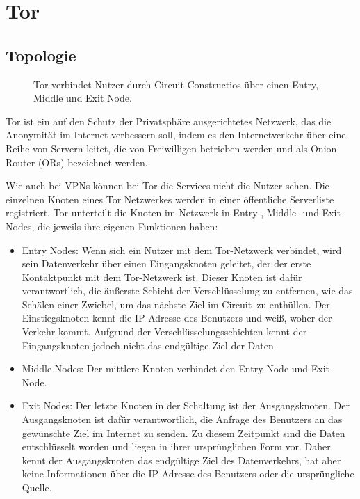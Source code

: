 \section{Tor}
\label{chap:tor}

\subsection{Topologie}
\label{chap:tor_topology}
 
\begin{figure}[h!]
    \centering
    
    \caption{Tor verbindet Nutzer durch Circuit Constructios über einen Entry, Middle und Exit Node.}
    \label{imgs:tor}
\end{figure}

Tor ist ein auf den Schutz der Privatsphäre ausgerichtetes Netzwerk, das die Anonymität im Internet verbessern soll, indem es den Internetverkehr über eine Reihe von Servern leitet, die von Freiwilligen betrieben werden und als Onion Router (ORs) bezeichnet werden.

Wie auch bei VPNs können bei Tor die Services nicht die Nutzer sehen. Die einzelnen Knoten eines Tor Netzwerkes werden in einer öffentliche Serverliste registriert. Tor unterteilt die Knoten im Netzwerk in Entry-, Middle- und Exit-Nodes, die jeweils ihre eigenen Funktionen haben:

\begin{itemize}
    \item Entry Nodes: Wenn sich ein Nutzer mit dem Tor-Netzwerk verbindet, wird sein Datenverkehr über einen Eingangsknoten geleitet, der der erste Kontaktpunkt mit dem Tor-Netzwerk ist. Dieser Knoten ist dafür verantwortlich, die äußerste Schicht der Verschlüsselung zu entfernen, wie das Schälen einer Zwiebel, um das nächste Ziel im \glqq Circuit\grqq\ zu enthüllen. Der Einstiegsknoten kennt die IP-Adresse des Benutzers und weiß, woher der Verkehr kommt. Aufgrund der Verschlüsselungsschichten kennt der Eingangsknoten jedoch nicht das endgültige Ziel der Daten.
    \item Middle Nodes: Der mittlere Knoten verbindet den Entry-Node und Exit-Node.
    \item Exit Nodes: Der letzte Knoten in der Schaltung ist der Ausgangsknoten. Der Ausgangsknoten ist dafür verantwortlich, die Anfrage des Benutzers an das gewünschte Ziel im Internet zu senden. Zu diesem Zeitpunkt sind die Daten entschlüsselt worden und liegen in ihrer ursprünglichen Form vor. Daher kennt der Ausgangsknoten das endgültige Ziel des Datenverkehrs, hat aber keine Informationen über die IP-Adresse des Benutzers oder die ursprüngliche Quelle.
\end{itemize}

